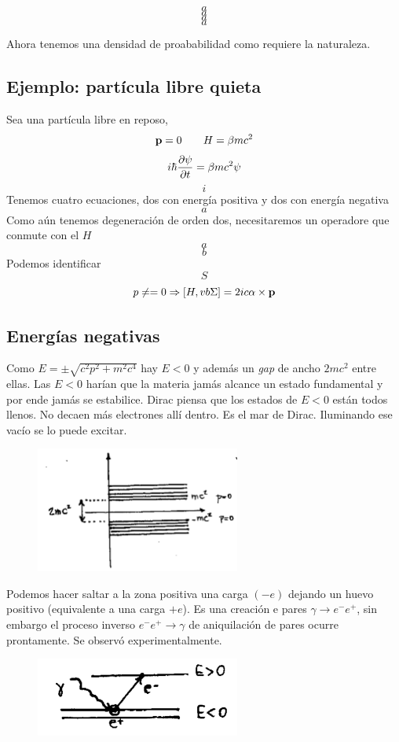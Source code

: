 \documentclass[10pt,oneside]{CBFT_book}
\begin{document}
\[
	a
\]
\[
	a
\]
\[
	a
\]
\[
	a
\]

Ahora tenemos una densidad de proababilidad como requiere la naturaleza.

\subsection{Ejemplo: partícula libre quieta}

Sea una partícula libre en reposo,
\[
	\vb{p} = 0 \qquad H=\beta m c^2
\]
\[
	i \hbar \frac{\partial^{\hspace{-0.05em}} {\psi}}{\partial {t}^{\hspace{-0.05em}}} = \beta m c^2 \psi
\]
\[
	i
\]
Tenemos cuatro ecuaciones, dos con energía positiva y dos con energía negativa
\[
	a
\]
Como aún tenemos degeneración de orden dos, necesitaremos un operadore que conmute con el $H$
\[
	a
\]
\[
	b
\]
Podemos identificar 
\[
	S
\]
\[
	p \neq = 0  \Rightarrow [H, vb{\Sigma}] = 2ic \vb{\alpha} \times \vb{p}
\]

\subsection{Energías negativas}

Como $E = \pm  \sqrt{ c^2 p^2 + m^2 c^4 } $ hay $E<0$ y además un {\it gap} de ancho $2mc^2$ entre ellas.
Las $E<0$ harían que la materia jamás alcance un estado fundamental y por ende jamás se estabilice.
Dirac piensa que los estados de $E<0$ están todos llenos. No decaen más electrones allí dentro. Es el mar de 
Dirac. Iluminando ese vacío se lo puede excitar.

\begin{figure}[htb]
	\begin{center}
	\includegraphics[width=0.6\textwidth]{images/teo2_13.pdf}
	\end{center}
	\caption{}
\end{figure} 

Podemos hacer saltar a la zona positiva una carga $(-e)$ dejando un huevo positivo (equivalente a una carga 
$+e$). Es una creación e pares $\gamma \to e^-e^+$, sin embargo el proceso inverso $ e^-e^+ \to \gamma$ de 
aniquilación de pares ocurre prontamente.
Se observó experimentalmente.

\begin{figure}[htb]
	\begin{center}
	\includegraphics[width=0.6\textwidth]{images/teo2_14.pdf}
	\end{center}
	\caption{}
\end{figure} 


\end{document}
